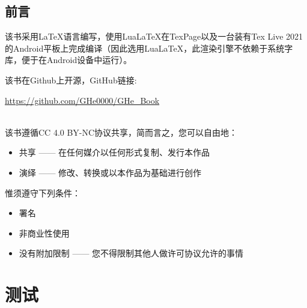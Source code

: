 \documentclass{gbook}
\begin{document}
 

\newpage

\section{前言}

该书采用\LaTeX 语言编写，使用Lua\LaTeX 在TexPage以及一台装有Tex Live 2021的Android平板上完成编译（因此选用Lua\LaTeX，此渲染引擎不依赖于系统字库，便于在Android设备中运行）。
~\\

\begin{minipage}[b]{0.6\linewidth}
该书在Github上开源，GitHub链接:

\url{https://github.com/GHe0000/GHe_Book} 
\end{minipage}
\hfill
\begin{minipage}[b]{0.1\linewidth}
\end{minipage}
~\\

该书遵循CC 4.0 BY-NC协议共享，简而言之，您可以自由地：
\begin{itemize}
    \item 共享 —— 在任何媒介以任何形式复制、发行本作品
    \item 演绎 —— 修改、转换或以本作品为基础进行创作
\end{itemize}

惟须遵守下列条件：
\begin{itemize}
    \item 署名
    \item 非商业性使用
    \item 没有附加限制 —— 您不得限制其他人做许可协议允许的事情
\end{itemize}


\tableofcontents

\setcounter{page}{0}

\newpage








\chapter{测试}
\end{document}

